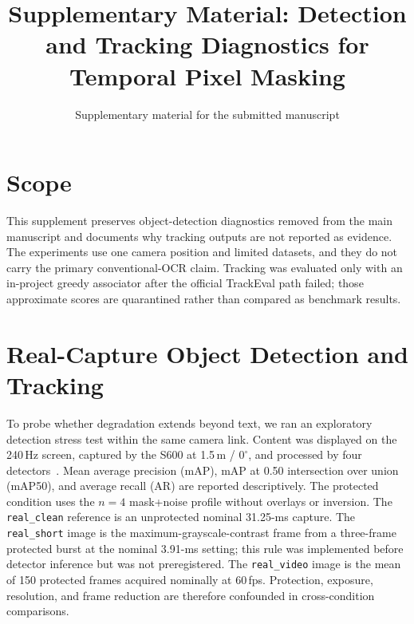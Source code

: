 \documentclass{ieeeaccess}
\begin{document}
\doi{}

\title{Supplementary Material: Detection and Tracking Diagnostics for Temporal Pixel Masking}
\author{Supplementary material for the submitted manuscript}
\maketitle

\section{Scope}

This supplement preserves object-detection diagnostics removed from the main manuscript and documents why tracking outputs are not reported as evidence. The experiments use one camera position and limited datasets, and they do not carry the primary conventional-OCR claim. Tracking was evaluated only with an in-project greedy associator after the official TrackEval path failed; those approximate scores are quarantined rather than compared as benchmark results.

\section{Real-Capture Object Detection and Tracking}
\label{sec:supp_real_detection}

To probe whether degradation extends beyond text, we ran an exploratory detection stress test within the same camera link. Content was displayed on the 240\,Hz screen, captured by the S600 at 1.5\,m / $0^{\circ}$, and processed by four detectors~\cite{b_yolo26,b_rtdetr2024,b_fasterrcnn2015,b_retinanet2017}. Mean average precision (mAP), mAP at 0.50 intersection over union (mAP50), and average recall (AR) are reported descriptively. The protected condition uses the $n=4$ mask+noise profile without overlays or inversion. The \texttt{real\_clean} reference is an unprotected nominal 31.25-ms capture. The \texttt{real\_short} image is the maximum-grayscale-contrast frame from a three-frame protected burst at the nominal 3.91-ms setting; this rule was implemented before detector inference but was not preregistered. The \texttt{real\_video} image is the mean of 150 protected frames acquired nominally at 60\,fps. Protection, exposure, resolution, and frame reduction are therefore confounded in cross-condition comparisons.
\end{document}
